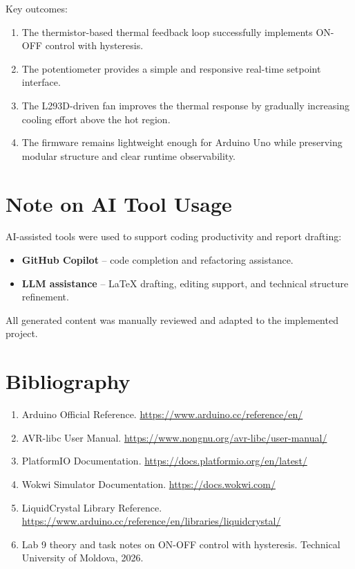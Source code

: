 \documentclass[12pt]{article}
\begin{document}
Key outcomes:
\begin{enumerate}
    \item The thermistor-based thermal feedback loop successfully implements ON-OFF control with hysteresis.
    \item The potentiometer provides a simple and responsive real-time setpoint interface.
    \item The L293D-driven fan improves the thermal response by gradually increasing cooling effort above the hot region.
    \item The firmware remains lightweight enough for Arduino Uno while preserving modular structure and clear runtime observability.
\end{enumerate}

\section*{Note on AI Tool Usage}
\hspace{0.8cm} AI-assisted tools were used to support coding productivity and report drafting:
\begin{itemize}
    \item \textbf{GitHub Copilot} -- code completion and refactoring assistance.
    \item \textbf{LLM assistance} -- LaTeX drafting, editing support, and technical structure refinement.
\end{itemize}
All generated content was manually reviewed and adapted to the implemented project.

\section*{Bibliography}
\begin{enumerate}
    \item Arduino Official Reference. \url{https://www.arduino.cc/reference/en/}
    \item AVR-libc User Manual. \url{https://www.nongnu.org/avr-libc/user-manual/}
    \item PlatformIO Documentation. \url{https://docs.platformio.org/en/latest/}
    \item Wokwi Simulator Documentation. \url{https://docs.wokwi.com/}
    \item LiquidCrystal Library Reference. \url{https://www.arduino.cc/reference/en/libraries/liquidcrystal/}
    \item Lab 9 theory and task notes on ON-OFF control with hysteresis. Technical University of Moldova, 2026.
\end{enumerate}
\end{document}
